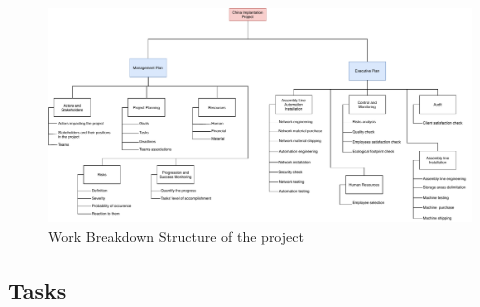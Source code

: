 \begin{figure}[h]

\centering
\includegraphics[scale=0.5]{Img/wbs-management-inter.pdf}
\caption{Work Breakdown Structure of the project}

\end{figure}

\subsection{Tasks}